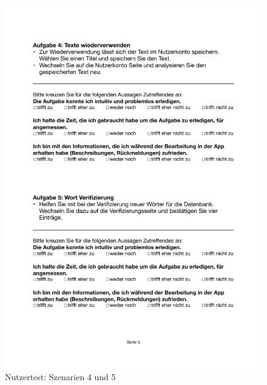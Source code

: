 \begin{figure}
	\centering
	\includegraphics[width=.95\linewidth, frame]{figures/evaluation/test45}
	\caption{Nutzertest: Szenarien 4 und 5}
	\label{fig:evaluation-test45}
\end{figure}
\newpage

